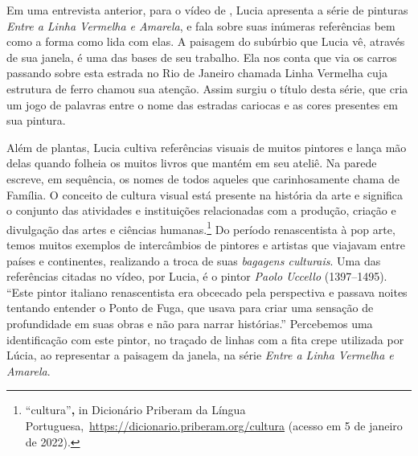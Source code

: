 Em uma entrevista anterior, para o vídeo de \textcite{cupello2007laguna},
Lucia apresenta a série de pinturas \emph{Entre a Linha Vermelha e
	Amarela}, e fala sobre suas inúmeras referências bem como a forma como
lida com elas. A paisagem do subúrbio que Lucia vê, através de sua
janela, é uma das bases de seu trabalho. Ela nos conta que via os
carros passando sobre esta estrada no Rio de Janeiro chamada Linha
Vermelha cuja estrutura de ferro chamou sua atenção. Assim surgiu o
título desta série, que cria um jogo de palavras entre o nome das
estradas cariocas e as cores presentes em sua pintura.

Além de plantas, Lucia cultiva referências visuais de muitos pintores e
lança mão delas quando folheia os muitos livros que mantém em seu
ateliê. Na parede escreve, em sequência, os nomes de todos aqueles que
carinhosamente chama de Família. O conceito de cultura visual está
presente na história da arte e significa o conjunto das atividades e
instituições relacionadas com a produção, criação e divulgação das
artes e ciências humanas.\footnote{\enquote{cultura}\textbf{,} in
	Dicionário Priberam da Língua
	Portuguesa,~\url{https://dicionario.priberam.org/cultura} (acesso
	em 5 de janeiro de 2022).} Do período renascentista à pop arte, temos muitos
exemplos de intercâmbios de pintores e artistas que viajavam entre
países e continentes, realizando a troca de suas \emph{bagagens
	culturais}. Uma das referências citadas no vídeo, por Lucia, é o pintor
\emph{Paolo Uccello} (1397--1495). \enquote{Este pintor italiano
	renascentista era obcecado pela perspectiva e passava noites tentando
	entender o Ponto de Fuga, que usava para criar uma sensação de
	profundidade em suas obras e não para narrar histórias.} Percebemos uma
identificação com este pintor, no traçado de linhas com a fita crepe
utilizada por Lúcia, ao representar a paisagem da janela, na série
\emph{Entre a Linha Vermelha e Amarela}.

